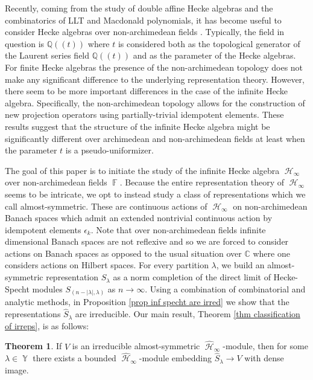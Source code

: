 \documentclass[12pt,reqno]{amsart}
\theoremstyle{definition}
\newtheorem*{thm*}{Theorem}
\DeclareMathOperator{\bF}{\mathbb{F}}
\DeclareMathOperator{\cH}{\mathcal{H}}
\DeclareMathOperator{\Par}{\mathbb{Y}}
\begin{document}
Recently, coming from the study of double affine Hecke algebras and the combinatorics of LLT and Macdonald polynomials, it  has become useful to consider Hecke algebras over non-archimedean fields \cite{Ion_2022}\cite{IonWu25}\cite{BW_Delta}\cite{BW25}\cite{BHMPS}. Typically, the field in question is $\mathbb{Q}((t))$ where $t$ is considered both as the topological generator of the Laurent series field $\mathbb{Q}((t))$ and as the parameter of the Hecke algebras. For finite Hecke algebras the presence of the non-archimedean topology does not make any significant difference to the underlying representation theory. However, there seem to be more important differences in the case of the infinite Hecke algebra. Specifically, the non-archimedean topology allows for the construction of new projection operators using partially-trivial idempotent elements. These results suggest that the structure of the infinite Hecke algebra might be significantly different over archimedean and non-archimedean fields at least when the parameter $t$ is a pseudo-uniformizer. 

The goal of this paper is to initiate the study of the infinite Hecke algebra $\cH_{\infty}$ over non-archimedean fields $\bF$. Because the entire representation theory of $\cH_{\infty}$ seems to be intricate, we opt to instead study a class of representations which we call almost-symmetric. These are continuous actions of $\cH_{\infty}$ on non-archimedean Banach spaces which admit an extended nontrivial continuous action by idempotent elements $\epsilon_{k}$. Note that over non-archimedean fields infinite dimensional Banach spaces are not reflexive and so we are forced to consider actions on Banach spaces as opposed to the usual situation over $\mathbb{C}$ where one considers actions on Hilbert spaces. For every partition $\lambda$, we build an almost-symmetric representation $\hat{S}_{\lambda}$ as a norm completion of the direct limit of Hecke-Specht modules $S_{(n-|\lambda|,\lambda)}$ as $n \rightarrow \infty.$ Using a combination of combinatorial and analytic methods, in Proposition \ref{prop inf specht are irred} we show that the representations $\hat{S}_{\lambda}$ are irreducible. Our main result, Theorem \ref{thm classification of irreps}, is as follows:

\begin{thm*}
    If $V$ is an irreducible almost-symmetric $\widehat{\cH}_{\infty}$-module, then for some $\lambda \in \Par$ there exists a bounded $\widehat{\cH}_{\infty}$-module embedding $ \hat{S}_{\lambda}\rightarrow  V$ with dense image.
\end{thm*}
\end{document}
